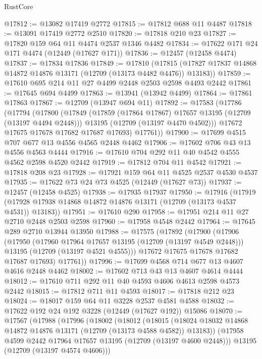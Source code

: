 \begin{lexlean}{RustCore}
\begin{coremodule}
@17812 := @13082 @17419 @2772
@17815 := @17812 @688 @11 @4487
@17818 := @13091 @17419 @2772 @2510
@17820 := @17818 @210 @23
@17827 := @17820 @159 @64 @11 @4474 @2537 @1346 @4482
@17834 := @17622 @171 @24 @171 @4474 (@12449 (@17627 @171))
@17836 := @12457 (@12458 @4474)
@17837 := @17834 @17836
@17849 := @17810
    (@17815 (@17827 @17837 @14868 @14872 @14876 @13171 (@12709 (@13173 @4482 @4476)) @13183))
@17859 := @17610 @695 @214 @11 @27 @4499 @2448 @2503 @2598 @4493 @2442
@17861 := @17645 @694 @4499
@17863 := @13941 (@13942 @4499)
@17864 := @17861 @17863
@17867 := @12709 (@13947 @694 @11)
@17892 := @17583
    (@17786
      (@17794
        (@17800
          (@17849
            (@17859 (@17864 @17867) @17657 @13195 (@12709 (@13197 @4494 @2448)))
            @13195
            (@12709 (@13197 @4470 @4502)))
          @17672
          @17675
          @17678
          @17682
          @17687
          @17693)
        @17761))
@17900 := @17699 @4515 @707 @677 @13 @4556 @4565 @2448 @4462
@17906 := @17602 @706 @43 @13 @4556 @4563 @4444
@17916 := @17610 @704 @292 @11 @40 @4542 @4555 @4562 @2598 @4520 @2442
@17919 := @17812 @704 @11 @4542
@17921 := @17818 @208 @23
@17928 := @17921 @159 @64 @11 @4525 @2537 @4530 @4537
@17935 := @17622 @73 @24 @73 @4525 (@12449 (@17627 @73))
@17937 := @12457 (@12458 @4525)
@17938 := @17935 @17937
@17950 := @17916
    (@17919 (@17928 @17938 @14868 @14872 @14876 @13171 (@12709 (@13173 @4537 @4531)) @13183))
@17951 := @17610 @290
@17958 := @17951 @214 @11 @27 @2710 @2448 @2503 @2598
@17960 := @17958 @4548 @2442
@17964 := @17645 @289 @2710 @13944 @13950
@17988 := @17575
    (@17892
      (@17900
        (@17906
          (@17950
            (@17960 @17964 @17657 @13195 (@12709 (@13197 @4549 @2448)))
            @13195
            (@12709 (@13197 @4521 @4555)))
          @17672
          @17675
          @17678
          @17682
          @17687
          @17693)
        @17761))
@17996 := @17699 @4568 @714 @677 @13 @4607 @4616 @2448 @4462
@18002 := @17602 @713 @43 @13 @4607 @4614 @4444
@18012 := @17610 @711 @292 @11 @40 @4593 @4606 @4613 @2598 @4573 @2442
@18015 := @17812 @711 @11 @4593
@18017 := @17818 @212 @23
@18024 := @18017 @159 @64 @11 @3228 @2537 @4581 @4588
@18032 := @17622 @192 @24 @192 @3228 (@12449 (@17627 @192)) @15086
@18070 := @17567
    (@17988
      (@17996
        (@18002
          (@18012
            (@18015
              (@18024 @18032 @14868 @14872 @14876 @13171 (@12709 (@13173 @4588 @4582)) @13183))
            (@17958 @4599 @2442 @17964 @17657 @13195 (@12709 (@13197 @4600 @2448)))
            @13195
            (@12709 (@13197 @4574 @4606)))

\end{coremodule}
\end{lexlean}
